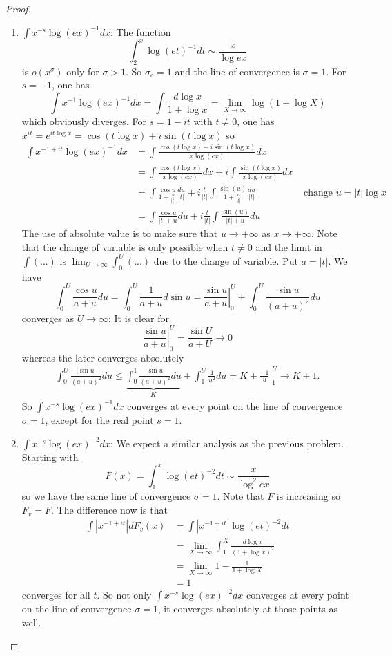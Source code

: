 \documentclass[12pt]{article}
\begin{document}
\begin{proof}
\begin{enumerate}
\item $\int x^{-s} \log(ex)^{-1} dx$: The function
$$\int_2^x \log(et)^{-1} dt \sim \frac{x}{\log ex}$$
is $o(x^\sigma)$ only for $\sigma > 1$. So $\sigma_c = 1$ and the line of convergence is $\sigma = 1$. For $s = -1$, one has
$$\int x^{-1} \log(ex)^{-1} dx = \int \frac{d\log x}{1 + \log x} = \lim_{X \rightarrow \infty} \log(1 + \log X)$$
which obviously diverges. For $s = 1 - it$ with $t \not= 0$, one has $x^{it} = e^{i t \log x} = \cos(t\log x) + i \sin(t\log x)$ so
\begin{align*}
\int x^{-1+it} \log(ex)^{-1} dx &= \int \frac{\cos(t\log x) + i \sin(t\log x)}{x \log(ex)} dx\\
&= \int \frac{\cos(t\log x)}{x \log(ex)} dx + i \int \frac{\sin(t\log x)}{x \log(ex)} dx\\
&= \int \frac{\cos u}{1 + \frac{u}{|t|}} \frac{du}{|t|} + i \frac{t}{|t|} \int \frac{\sin(u)}{1 + \frac{u}{|t|}} \frac{du}{|t|} &\text{ change } u = |t| \log x\\
&= \int \frac{\cos u}{|t| + u} du + i \frac{t}{|t|} \int \frac{\sin(u)}{|t| + u} du
\end{align*}
The use of absolute value is to make sure that $u \rightarrow +\infty$ as $x \rightarrow +\infty$. Note that the change of variable is only possible when $t \not= 0$ and the limit in $\int (...)$ is $\lim_{U \rightarrow \infty} \int_0^U (...)$ due to the change of variable. Put $a = |t|$. We have
$$\int_0^U \frac{\cos u}{a + u} du = \int_0^U \frac{1}{a + u} d\sin u = \left. \frac{\sin u}{a + u} \right|_0^U + \int_0^U \frac{\sin u}{(a + u)^2} du$$
converges as $U \rightarrow \infty$: It is clear for
$$\left. \frac{\sin u}{a + u} \right|_0^U = \frac{\sin U}{a + U} \rightarrow 0$$
whereas the later converges absolutely
\begin{align*}
\int_0^U \frac{|\sin u|}{(a + u)^2} du \leq \underbrace{\int_0^1 \frac{|\sin u|}{(a + u)^2} du}_{K} + \int_{1}^{U} \frac{1}{u^2} du = K + \left. \frac{-1}{u} \right|_{1}^{U} \rightarrow K + 1.
\end{align*}
So $\int x^{-s} \log(ex)^{-1} dx$ converges at every point on the line of convergence $\sigma = 1$, except for the real point $s = 1$.

\item $\int x^{-s} \log(ex)^{-2} dx$: We expect a similar analysis as the previous problem. Starting with
$$F(x) = \int_1^x \log(et)^{-2} dt \sim \frac{x}{\log^2 ex}$$
so we have the same line of convergence $\sigma = 1$. Note that $F$ is increasing so $F_v = F$. The difference now is that
\begin{align*}
\int |x^{-1+it}| d F_v(x) &= \int |x^{-1+it}| \log(et)^{-2} dt\\
&= \lim_{X \rightarrow \infty} \int_1^X \frac{d \log x}{(1 + \log x)^2}\\
&= \lim_{X \rightarrow \infty} 1 - \frac{1}{1 + \log X}\\
&= 1
\end{align*}
converges for all $t$. So not only $\int x^{-s} \log(ex)^{-2} dx$ converges at every point on the line of convergence $\sigma = 1$, it converges absolutely at those points as well.
\end{enumerate}
\end{proof}

\unless\ifdefined\IsMainDocument
\end{document}
